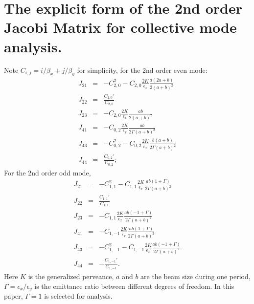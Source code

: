 
\chapter{The explicit form of the 2nd order Jacobi Matrix for collective mode analysis.}
\label{appdendix:Jacobi}
Note $C_{i,j}=i/\beta_x+j/\beta_y$ for simplicity, for the 2nd order even mode:
\begin{eqnarray}\label{eq6.1}
J_{21} &=& - C_{2,0}^2 - C_{2,0} \frac{2 K}{\epsilon_x} \frac{a (2a+b) }{2  (a+b)^2} \nonumber  \\
J_{22} &=& \frac{C_{2,0}'}{C_{2,0}} \nonumber  \\
J_{23} &=& - C_{2,0} \frac{2 K}{\epsilon_x} \frac{a b }{2 (a+b)^2} \nonumber  \\
J_{41} &=& - C_{0,2} \frac{2 K}{\epsilon_x} \frac{a b }{2 \Gamma (a+b)^2} \nonumber  \\
J_{43} &=& - C_{0,2}^2 - C_{0,2} \frac{2 K}{\epsilon_x} \frac{ b(a+b) }{2 \Gamma (a+b)^2} \nonumber  \\
J_{44} &=& \frac{C_{0,2}'}{C_{0,2}};
\end{eqnarray}
For the 2nd order odd mode,
\begin{eqnarray}\label{eq6.2}
J_{21} &=& - C_{1,1}^2 - C_{1,1} \frac{2 K}{\epsilon_x} \frac{a b (1+\Gamma)}{2 \Gamma (a+b)^2} \nonumber  \\
J_{22} &=& \frac{C_{1,1}'}{C_{1,1}} \nonumber  \\
J_{23} &=& - C_{1,1} \frac{2 K}{\epsilon_x} \frac{a b (-1+\Gamma)}{2 \Gamma (a+b)^2} \nonumber  \\
J_{41} &=& - C_{1,-1} \frac{2 K}{\epsilon_x} \frac{a b (1+\Gamma)}{2 \Gamma (a+b)^2} \nonumber  \\
J_{43} &=& - C_{1,-1}^2 - C_{1,-1} \frac{2 K}{\epsilon_x} \frac{a b (-1+\Gamma)}{2 \Gamma (a+b)^2} \nonumber  \\
J_{44} &=& -\frac{C_{1,-1}'}{C_{1,-1}}.
\end{eqnarray}
Here $K$ is the generalized  perveance,  $a$ and $b$ are the beam size during one period, $\Gamma=\epsilon_x/\epsilon_y$ is the emittance ratio between different degrees of freedom. In this paper, $\Gamma=1$ is selected for analysis.


